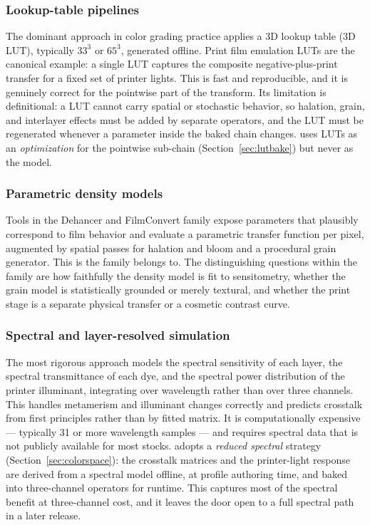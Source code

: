 \subsubsection{Lookup-table pipelines}
The dominant approach in color grading practice applies a 3D lookup table (3D
LUT), typically $33^3$ or $65^3$, generated offline. Print film emulation LUTs
are the canonical example: a single LUT captures the composite negative-plus-print
transfer for a fixed set of printer lights. This is fast and reproducible, and
it is genuinely correct for the pointwise part of the transform. Its limitation
is definitional: a LUT cannot carry spatial or stochastic behavior, so halation,
grain, and interlayer effects must be added by separate operators, and the LUT
must be regenerated whenever a parameter inside the baked chain changes. \EM{}
uses LUTs as an \emph{optimization} for the pointwise sub-chain
(Section~\ref{sec:lutbake}) but never as the model.

\subsubsection{Parametric density models}
Tools in the Dehancer and FilmConvert family expose parameters that plausibly
correspond to film behavior and evaluate a parametric transfer function per
pixel, augmented by spatial passes for halation and bloom and a procedural
grain generator. This is the family \EM{} belongs to. The distinguishing
questions within the family are how faithfully the density model is fit to
sensitometry, whether the grain model is statistically grounded or merely
textural, and whether the print stage is a separate physical transfer or a
cosmetic contrast curve.

\subsubsection{Spectral and layer-resolved simulation}
The most rigorous approach models the spectral sensitivity of each layer, the
spectral transmittance of each dye, and the spectral power distribution of the
printer illuminant, integrating over wavelength rather than over three
channels. This handles metamerism and illuminant changes correctly and predicts
crosstalk from first principles rather than by fitted matrix. It is
computationally expensive --- typically 31 or more wavelength samples --- and
requires spectral data that is not publicly available for most stocks. \EM{}
adopts a \emph{reduced spectral} strategy (Section~\ref{sec:colorspace}): the
crosstalk matrices and the printer-light response are derived from a spectral
model offline, at profile authoring time, and baked into three-channel
operators for runtime. This captures most of the spectral benefit at
three-channel cost, and it leaves the door open to a full spectral path in a
later release.

